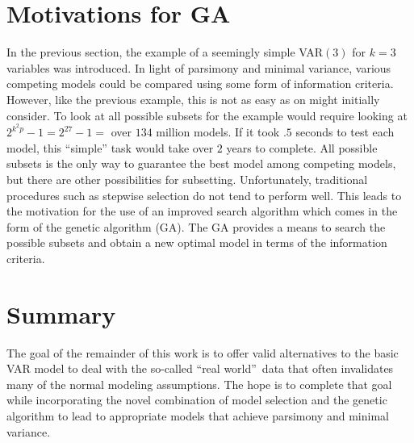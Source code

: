 \section{Motivations for GA}

In the previous section, the example of a seemingly simple VAR$(3)$
for $k=3$ variables was introduced. In light of parsimony and minimal
variance, various competing models could be compared using some form
of information criteria. However, like the previous example, this
is not as easy as on might initially consider. To look at all possible
subsets for the example would require looking at $2^{k^{2}p}-1=2^{27}-1=$
over $134$ million models. If it took $.5$ seconds to test each
model, this ``simple\textquotedblright{} task would take over $2$
years to complete. All possible subsets is the only way to guarantee
the best model among competing models, but there are other possibilities
for subsetting. Unfortunately, traditional procedures such as stepwise
selection do not tend to perform well. This leads to the motivation
for the use of an improved search algorithm which comes in the form
of the genetic algorithm (GA). The GA provides a means to search the
possible subsets and obtain a new optimal model in terms of the information
criteria.


\section{Summary}

The goal of the remainder of this work is to offer valid alternatives
to the basic VAR model to deal with the so-called ``real world\textquotedblright{}\ data
that often invalidates many of the normal modeling assumptions. The
hope is to complete that goal while incorporating the novel combination
of model selection and the genetic algorithm to lead to appropriate
models that achieve parsimony and minimal variance.
